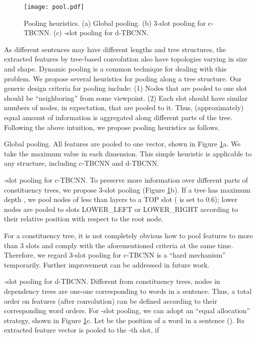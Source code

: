 \documentclass[11pt,a4paper]{article}
\begin{document}
\begin{figure}[!t]
\centering
\vspace{-.25cm}

\texttt{[image: pool.pdf]}

\vspace{-.6cm}
\caption{Pooling heuristics. (a) Global pooling.
(b) 3-slot pooling for c-TBCNN. (c) -slot pooling for d-TBCNN.}
\vspace{-.4cm}
\label{fPool}
\end{figure}

As different sentences may have different lengths and tree structures,
the extracted features by tree-based convolution also have topologies varying in size and shape.
Dynamic pooling \cite{dynamic} is a common technique for dealing with this problem.
We propose several heuristics for pooling along a tree structure.
Our generic design criteria for pooling include: (1) Nodes that are pooled to one slot should be ``neighboring'' from some viewpoint. (2) Each slot should have similar numbers of nodes, in expectation, that are pooled to it.
Thus, (approximately) equal amount of information is aggregated
along different parts of the tree. 
Following the above intuition, we propose pooling heuristics as follows.

\begin{compactitem}
\item Global pooling. All features are pooled to one vector, shown in Figure \ref{fPool}a.
We take
the maximum value in each dimension. This simple heuristic is applicable to
any structure, including c-TBCNN and d-TBCNN.

\item -slot pooling for c-TBCNN. To preserve more information over different parts of
constituency trees, we propose 3-slot pooling (Figure \ref{fPool}b).
If a tree has maximum depth ,
we pool nodes of less than  layers to a TOP slot ( is set to 0.6); lower nodes are pooled to slots LOWER\_LEFT
or LOWER\_RIGHT according to their relative position with respect to the root node.

For a constituency tree,
it is not completely obvious how to pool
features to more than 3 slots
and comply with the aforementioned criteria at the same time.
Therefore, we regard 3-slot pooling for c-TBCNN is a ``hard mechanism''
temporarily. Further improvement can be addressed in future work.


\item -slot pooling for d-TBCNN. Different from constituency trees,
nodes in dependency trees are one-one corresponding to
words in a sentence.
Thus, a total order on features (after convolution) can be defined according to
their corresponding word orders.
For -slot pooling,
we can adopt an ``equal allocation'' strategy, shown in Figure \ref{fPool}c.
Let  be the position of a word in a sentence ().
Its extracted feature vector is pooled to the -th slot, if

\vspace{-.3cm}


\end{compactitem}
\end{document}
